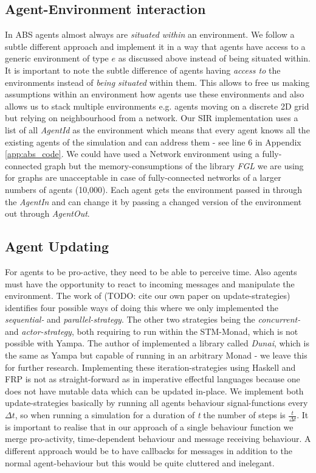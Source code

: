\subsection{Agent-Environment interaction}
\label{sub:agent_env_inter}
In ABS agents almost always are \textit{situated within} an environment. We follow a subtle different approach and implement it in a way that agents have access to a generic environment of type $e$ as discussed above instead of being situated within. It is important to note the subtle difference of agents having \textit{access to} the environments instead of \textit{being situated} within them. This allows to free us making assumptions within an environment how agents use these environments and also allows us to stack multiple environments e.g. agents moving on a discrete 2D grid but relying on neighbourhood from a network.
Our SIR implementation uses a list of all \textit{AgentId} as the environment which means that every agent knows all the existing agents of the simulation and can address them - see line 6 in Appendix \ref{app:abs_code}. We could have used a Network environment using a fully-connected graph but the memory-consumptions of the library \textit{FGL} we are using for graphs are unacceptable in case of fully-connected networks of a larger numbers of agents (10,000). Each agent gets the environment passed in through the \textit{AgentIn} and can change it by passing a changed version of the environment out through \textit{AgentOut}. 

\subsection{Agent Updating}
\label{sub:agent_updt}
For agents to be pro-active, they need to be able to perceive time. Also agents must have the opportunity to react to incoming messages and manipulate the environment. The work of (TODO: cite our own paper on update-strategies) identifies four possible ways of doing this where we only implemented the \textit{sequential-} and \textit{parallel-strategy}. The other two strategies being the  \textit{concurrent-} and \textit{actor-strategy}, both requiring to run within the STM-Monad, which is not possible with Yampa. The author of \cite{perez_functional_2016} implemented a library called \textit{Dunai}, which is the same as Yampa but capable of running in an arbitrary Monad - we leave this for further research. Implementing these iteration-strategies using Haskell and FRP is not as straight-forward as in imperative effectful languages because one does not have mutable data which can be updated in-place.
We implement both update-strategies basically by running all agents behaviour signal-functions every $\Delta t$, so when running a simulation for a duration of \textit{t} the number of steps is $\frac{t}{\Delta t}$. It is important to realise that in our approach of a single behaviour function we merge pro-activity, time-dependent behaviour and message receiving behaviour. A different approach would be to have callbacks for messages in addition to the normal agent-behaviour but this would be quite cluttered and inelegant.

